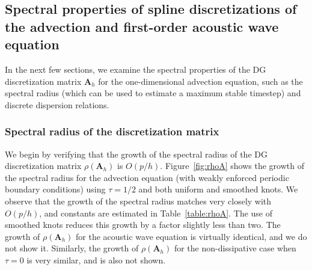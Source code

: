 \documentclass[preprint,10pt]{elsarticle}
\newcommand{\LRp}[1]{\left( #1 \right)}
\newcommand{\reviewerOne}[1]{#1}
\begin{document}
\subsection{Spectral properties of spline discretizations of the advection and first-order acoustic wave equation}

In the next few sections, we examine the spectral properties of the DG discretization matrix $\bm{A}_h$ for the \reviewerOne{one-dimensional} advection equation, such as the spectral radius (which can be used to estimate a maximum stable timestep) and discrete dispersion relations.  %

\subsubsection{Spectral radius of the discretization matrix}
\label{sec:specadv}
We begin by verifying that the growth of the spectral radius of the DG discretization matrix $\rho\LRp{\bm{A}_h}$ is $O(p/h)$.  Figure~\ref{fig:rhoA} shows the growth of the spectral radius for the advection equation (with weakly enforced periodic boundary conditions) using $\tau = 1/2$ and both uniform and smoothed knots.  We observe that the growth of the spectral radius matches very closely with $O(p/h)$, and constants are estimated in Table~\ref{table:rhoA}.  The use of smoothed knots reduces this growth by a factor slightly less than two.  The growth of $\rho\LRp{\bm{A}_h}$ for the acoustic wave equation is virtually identical, and we do not show it.  Similarly, the growth of $\rho\LRp{\bm{A}_h}$ for the non-dissipative case when $\tau = 0$ is very similar, and is also not shown.  
\end{document}

